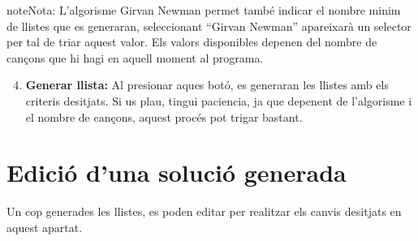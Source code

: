 \documentclass[letterpaper,10pt,oneside]{sphinxmanual}
\begin{document}
\begin{notice}{note}{Nota:}
L'algorisme Girvan Newman permet també indicar el nombre minim de llistes que es generaran, seleccionant ``Girvan Newman'' apareixarà un selector per tal de triar aquest valor. Els valors disponibles depenen del nombre de cançons que hi hagi en aquell moment al programa.
\end{notice}
\begin{enumerate}
\setcounter{enumi}{3}
\item {} 
\textbf{Generar llista:} Al presionar aques botó, es generaran les llistes amb els criteris desitjats. Si us plau, tingui paciencia, ja que depenent de l'algorisme i el nombre de cançons, aquest procés pot trigar bastant.

\end{enumerate}


\section{Edició d'una solució generada}
\label{gen_llistes:edicio-d-una-solucio-generada}
Un cop generades les llistes, es poden editar per realitzar els canvis desitjats en aquest apartat.
\end{document}

